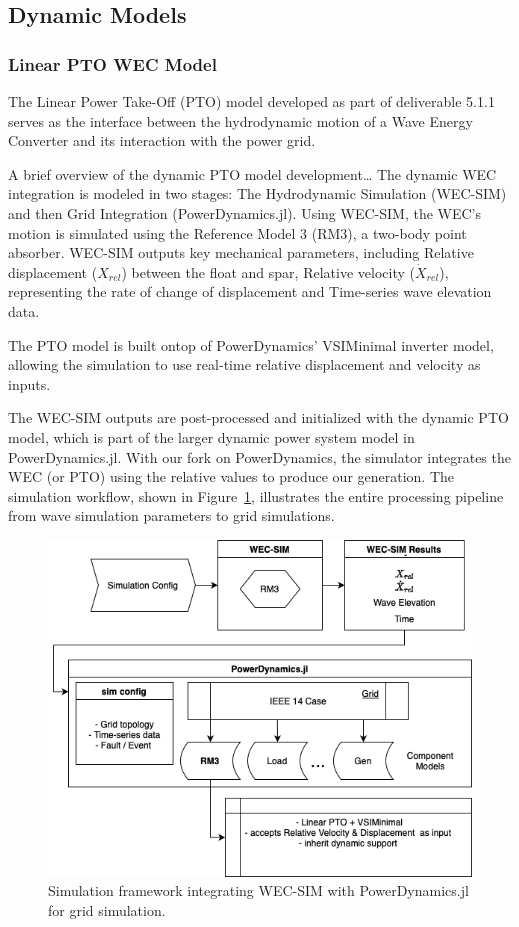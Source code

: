 \documentclass[conference]{IEEEtran}
\begin{document}
\subsection*{Dynamic Models}

    \subsubsection*{Linear PTO WEC Model}
    
    The Linear Power Take-Off (PTO) model developed as part of deliverable 5.1.1 serves as the interface between the hydrodynamic motion of a Wave Energy Converter and its interaction with the power grid. 

    A brief overview of the dynamic PTO model development… The dynamic WEC integration is modeled in two stages: The Hydrodynamic Simulation (WEC-SIM) and then Grid Integration (PowerDynamics.jl). Using WEC-SIM, the WEC's motion is simulated using the Reference Model 3 (RM3), a two-body point absorber. WEC-SIM outputs key mechanical parameters, including Relative displacement ($X_{rel}$) between the float and spar, Relative velocity ($\dot{X}_{rel}$), representing the rate of change of displacement and Time-series wave elevation data.

    The PTO model is built ontop of PowerDynamics' VSIMinimal inverter model, allowing the simulation to use real-time relative displacement and velocity as inputs.

    The WEC-SIM outputs are post-processed and initialized with the dynamic PTO model, which is part of the larger dynamic power system model in PowerDynamics.jl. With our fork on PowerDynamics, the simulator integrates the WEC (or PTO) using the relative values to produce our generation. The simulation workflow, shown in Figure~\ref{fig:wec_pipeline}, illustrates the entire processing pipeline from wave simulation parameters to grid simulations. 
    
    \begin{figure}[h]
        \centering
        \includegraphics[width=0.9\linewidth]{Figs/pipeline.drawio-2.png}
        \caption{Simulation framework integrating WEC-SIM with PowerDynamics.jl for grid simulation.}
        \label{fig:wec_pipeline}
    \end{figure}
    
\end{document}
